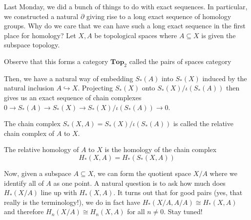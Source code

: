 \documentclass[12pt,reqno]{amsart}
\numberwithin{theorem}{section}
\theoremstyle{definition}
\theoremstyle{remark}
\numberwithin{equation}{section}
\newcommand{\del}{\partial}
\theoremstyle{definition}
\begin{document}
Last Monday, we did a bunch of things to do with exact sequences. In particular, we constructed a natural $\del$ giving rise to a long exact sequence of homology groups. Why do we care that we can have such a long exact sequence in the first place for homology? Let $X,A$ be topological spaces where $A\subseteq X$ is given the subspace topology. 
\begin{remark}
    Observe that this forms a category $\mathbf{Top}_2$ called the pairs of spaces category
\end{remark}
Then, we have a natural way of embedding $S_*(A)$ into $S_*(X)$ induced by the natural inclusion $A \hookrightarrow X$. Projecting $S_*(X)$ onto $S_*(X)/\iota(S_*(A))$ then gives us an exact sequence of chain complexes $0 \rightarrow S_*(A)\rightarrow S_*(X)\rightarrow S_*(X)/\iota(S_*(A))\rightarrow 0$. 
\begin{definition}
    The chain complex $S_*(X,A) = S_*(X)/\iota(S_*(A))$ is called the relative chain complex of $A$ to $X$.
\end{definition}
\begin{definition}
    The relative homology of $A$ to $X$ is the homology of the chain complex
    $$H_*(X,A) = H_*(S_*(X,A))$$
\end{definition} 
Now, given a subspace $A \subseteq X$, we can form the quotient space $X/A$ where we identify all of $A$ as one point. A natural question is to ask how much does $H_*(X/A)$ line up with $H_*(X,A)$. It turns out that for good pairs (yes, that really is the terminology!), we do in fact have $H_*(X/A,A/A) \cong H_*(X,A)$ and therefore $H_n(X/A)\cong H_n(X,A)$ for all $n \neq 0$. Stay tuned!
\end{document}
